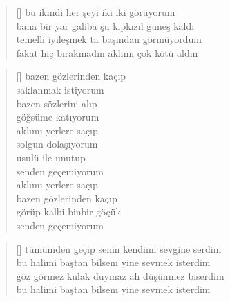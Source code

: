 \documentclass[10pt, openright, twoside]{memoir}
\theoremstyle{definition}
\begin{document}
\vspace*{\fill}
%
\newpage
{}
\vspace*{\fill}
\settowidth{\versewidth}{bana bir yar galiba şu kıpkızıl güneş kaldı}
\begin{verse}[\versewidth]
  bu ikindi her şeyi iki iki görüyorum \\
  bana bir yar galiba şu kıpkızıl güneş kaldı \\
  temelli iyileşmek ta başından görmüyordum \\
  fakat hiç bırakmadın aklımı çok kötü aldın
\end{verse}
\vspace*{\fill}
%
\newpage
{}
\vspace*{\fill}
\settowidth{\versewidth}{görüp kalbi binbir göçük}
\begin{verse}[\versewidth]
  bazen gözlerinden kaçıp \\
  saklanmak istiyorum \\
  bazen sözlerini alıp \\
  göğsüme katıyorum \\
  aklımı yerlere saçıp \\
  solgun dolaşıyorum \\
  usulü ile unutup \\
  senden geçemiyorum \\
  aklımı yerlere saçıp \\
  bazen gözlerinden kaçıp \\
  görüp kalbi binbir göçük \\
  senden geçemiyorum
\end{verse}
\vspace*{\fill}
%
\newpage
{}
\vspace*{\fill}
\settowidth{\versewidth}{bu halimi baştan bilsem yine sevmek isterdim}
\begin{verse}[\versewidth]
  tümümden geçip senin kendimi sevgine serdim \\
  bu halimi baştan bilsem yine sevmek isterdim \\
  göz görmez kulak duymaz ah düşünmez biserdim \\
  bu halimi baştan bilsem yine sevmek isterdim \\
\end{verse}
\vspace*{\fill}
%
\newpage
{}
\end{document}
